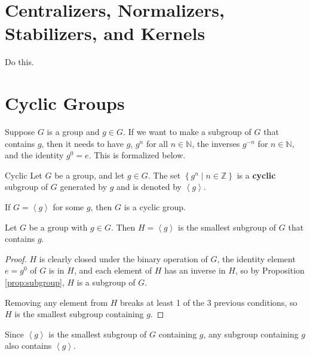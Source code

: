 \documentclass[10pt]{report}
\begin{document}

\section{Centralizers, Normalizers, Stabilizers, and Kernels}

{\color{red}Do this.}


\section{Cyclic Groups}

Suppose $G$ is a group and $g \in G$. If we want to make a subgroup of $G$ that contains $g$, then it needs to have $g$, $g^n$ for all $n \in \mathbb{N}$, the inverses $g^{-n}$ for $n \in \mathbb{N}$, and the identity $g^0 = e$. This is formalized below.

\begin{defn}{Cyclic}{}
	Let $G$ be a group, and let $g \in G$. The set $\left\{ g^n \;|\; n \in \mathbb{Z} \right\}$ is a \textbf{cyclic} subgroup of $G$ generated by $g$ and is denoted by $\left\langle g \right\rangle$.

	If $G = \left\langle g \right\rangle$ for some $g$, then $G$ is a cyclic group.
\end{defn}

\begin{thrm}{}{}
Let $G$ be a group with $g \in G$. Then $H=\left\langle g \right\rangle$ is the smallest subgroup of $G$ that contains $g$.
\end{thrm}
\begin{proof}
	$H$ is clearly closed under the binary operation of $G$, the identity element $e=g^0$ of $G$ is in $H$, and each element of $H$ has an inverse in $H$, so by Proposition \ref{prop:subgroup}, $H$ is a subgroup of $G$.

	Removing any element from $H$ breaks at least 1 of the 3 previous conditions, so $H$ is the smallest subgroup containing $g$.
\end{proof}

\begin{note}{}{}
Since $\left\langle g \right\rangle$ is the smallest subgroup of $G$ containing $g$, any subgroup containing $g$ also contains $\left\langle g \right\rangle$.
\end{note}
\end{document}
